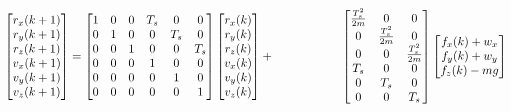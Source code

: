 \documentclass[conference, tikz]{IEEEtran}
\begin{document}
\begin{center}
\begin{equation}
    \begin{bmatrix}
        r_x(k+1)\\
        r_y(k+1)\\
        r_z(k+1)\\
        v_x(k+1)\\
        v_y(k+1)\\
        v_z(k+1)\\
    \end{bmatrix}
    =
    \begin{bmatrix}
       1 & 0 & 0 & T_s & 0 & 0\\
       0 & 1 & 0 & 0 & T_s & 0\\
       0 & 0 & 1 & 0 & 0 & T_s\\
       0 & 0 & 0 & 1 & 0 & 0\\
       0 & 0 & 0 & 0 & 1 & 0\\
       0 & 0 & 0 & 0 & 0 & 1
    \end{bmatrix}
    \begin{bmatrix}
        r_x(k)\\
        r_y(k)\\
        r_z(k)\\
        v_x(k)\\
        v_y(k)\\
        v_z(k)\\
    \end{bmatrix}
    +
    \hspace*{2cm}

    \begin{bmatrix}
        \frac{T_s^2}{2m} & 0 & 0\\
        0 & \frac{T_s^2}{2m} & 0\\
        0 & 0 & \frac{T_s^2}{2m}\\
        T_s & 0 & 0\\
        0 & T_s & 0\\
        0 & 0 & T_s
    \end{bmatrix}
    \begin{bmatrix}
        f_x(k)+w_x\\
        f_y(k)+w_y\\
        f_z(k)-mg\\
    \end{bmatrix}
    \label{eq:1}
\end{equation}
\end{center}
\end{document}
